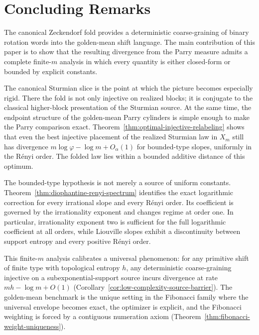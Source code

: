 \section{Concluding Remarks}
\label{sec:concluding}

The canonical Zeckendorf fold provides a deterministic coarse-graining of
binary rotation words into the golden-mean shift language. The main
contribution of this paper is to show that the resulting divergence from the
Parry measure admits a complete finite-\(m\) analysis in which every quantity
is either closed-form or bounded by explicit constants.

The canonical Sturmian slice is the point at which the picture becomes
especially rigid. There the fold is not only injective on realized blocks; it
is conjugate to the classical higher-block presentation of the Sturmian source.
At the same time, the endpoint structure of the golden-mean Parry cylinders is
simple enough to make the Parry comparison exact.
Theorem~\ref{thm:optimal-injective-relabeling} shows that even the best
injective placement of the realized Sturmian law in \(X_m\) still has
divergence \(m\log\varphi-\log m+O_\alpha(1)\) for bounded-type slopes,
uniformly in the R\'enyi order. The folded law lies within a bounded additive
distance of this optimum.

The bounded-type hypothesis is not merely a source of uniform constants.
Theorem~\ref{thm:diophantine-renyi-spectrum} identifies the exact logarithmic
correction for every irrational slope and every R\'enyi order. Its coefficient
is governed by the irrationality exponent and changes regime at order one. In
particular, irrationality exponent two is sufficient for the full logarithmic
coefficient at all orders, while Liouville slopes exhibit a discontinuity
between support entropy and every positive R\'enyi order.

This finite-\(m\) analysis calibrates a universal phenomenon: for any
primitive shift of finite type with topological entropy \(h\), any
deterministic coarse-graining injective on a subexponential-support source
incurs divergence at rate \(mh-\log m+O(1)\)
(Corollary~\ref{cor:low-complexity-source-barrier}). The golden-mean benchmark
is the unique setting in the Fibonacci family where the universal envelope
becomes exact, the optimizer is explicit, and the Fibonacci weighting is forced
by a contiguous numeration axiom
(Theorem~\ref{thm:fibonacci-weight-uniqueness}).

